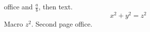 \documentclass{article}
\newcommand{\sq}[1]{#1^2}
\begin{document}
office and $\frac{a}{b}$, then text.
\[x^2+y^2=z^2\]
Macro $\sq{z}$.
\newpage
Second page office.
\end{document}
